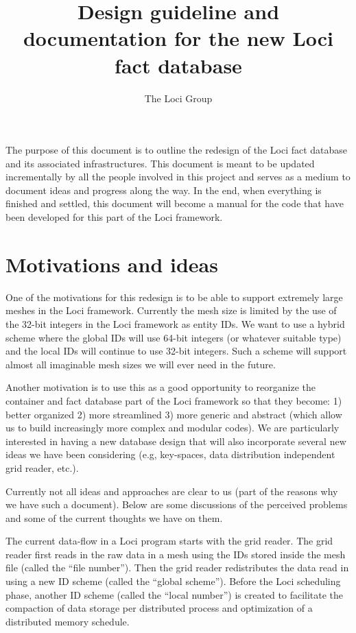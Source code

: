 \documentclass{article}
\begin{document}
\title{Design guideline and documentation for the new Loci fact database}

\author{The Loci Group}

\maketitle

The purpose of this document is to outline the redesign of the Loci fact
database and its associated infrastructures.  This document is meant to
be updated incrementally by all the people involved in this project and
serves as a medium to document ideas and progress along the way.  In the
end, when everything is finished and settled, this document will become
a manual for the code that have been developed for this part of the Loci
framework.

\section{Motivations and ideas}
One of the motivations for this redesign is to be able to support
extremely large meshes in the Loci framework.  Currently the mesh size
is limited by the use of the 32-bit integers in the Loci framework as
entity IDs.  We want to use a hybrid scheme where the global IDs will
use 64-bit integers (or whatever suitable type) and the local IDs will
continue to use 32-bit integers.  Such a scheme will support almost all
imaginable mesh sizes we will ever need in the future.

Another motivation is to use this as a good opportunity to reorganize
the container and fact database part of the Loci framework so that they
become: 1) better organized 2) more streamlined 3) more generic and
abstract (which allow us to build increasingly more complex and modular
codes).  We are particularly interested in having a new database
design that will also incorporate several new ideas we have been
considering (e.g, key-spaces, data distribution independent grid reader,
etc.).

Currently not all ideas and approaches are clear to us (part of the
reasons why we have such a document).  Below are some discussions of the
perceived problems and some of the current thoughts we have on them.

The current data-flow in a Loci program starts with the grid reader.
The grid reader first reads in the raw data in a mesh using the IDs
stored inside the mesh file (called the ``file number'').  Then the grid
reader redistributes the data read in using a new ID scheme (called the
``global scheme'').  Before the Loci scheduling phase, another ID scheme
(called the ``local number'') is created to facilitate the compaction
of data storage per distributed process and optimization of a
distributed memory schedule.
\end{document}
